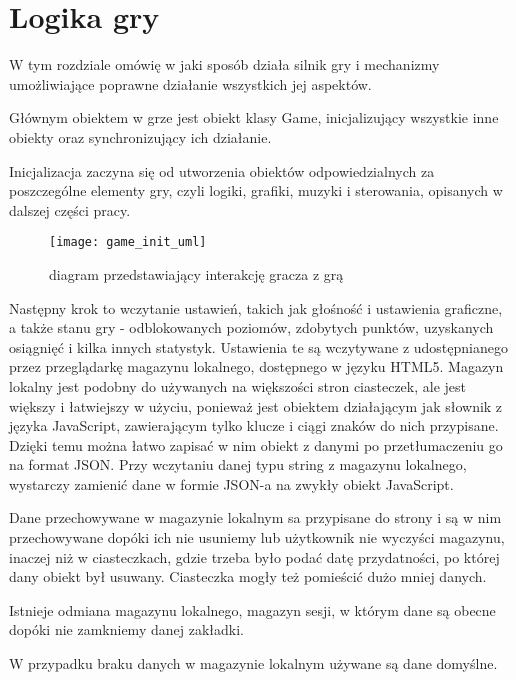 \chapter{Logika gry}
\thispagestyle{chapterBeginStyle}
\label{chapter_logic}

\smallskip

W tym rozdziale omówię w jaki sposób działa silnik gry i mechanizmy umożliwiające poprawne działanie wszystkich jej aspektów.

Głównym obiektem w grze jest obiekt klasy Game, inicjalizujący wszystkie inne obiekty oraz synchronizujący ich działanie.

Inicjalizacja zaczyna się od utworzenia obiektów odpowiedzialnych za poszczególne elementy gry, czyli logiki, grafiki, muzyki i sterowania, opisanych w dalszej czę\'sci pracy.

\begin{wrapfigure}{l}{0.39\textwidth}
	\centering
	\noindent\texttt{[image: game\_init\_uml]}
	\caption{diagram przedstawiający interakcję gracza z grą}
\end{wrapfigure}
Następny krok to wczytanie ustawień, takich jak gło\'sno\'sć i ustawienia graficzne, a także stanu gry - odblokowanych poziomów, zdobytych punktów, uzyskanych osiągnięć i kilka innych statystyk. Ustawienia te są wczytywane z udostępnianego przez przeglądarkę magazynu lokalnego, dostępnego w języku HTML5. Magazyn lokalny jest podobny do używanych na większo\'sci stron ciasteczek, ale jest większy i łatwiejszy w użyciu, ponieważ jest obiektem działającym jak słownik z języka JavaScript, zawierającym tylko klucze i ciągi znaków do nich przypisane. Dzięki temu można łatwo zapisać w nim obiekt z danymi po przetłumaczeniu go na format JSON. Przy wczytaniu danej typu string z magazynu lokalnego, wystarczy zamienić dane w formie JSON-a na zwykły obiekt JavaScript.

Dane przechowywane w magazynie lokalnym sa przypisane do strony i są w nim przechowywane dopóki ich nie usuniemy lub użytkownik nie wyczy\'sci magazynu, inaczej niż w ciasteczkach, gdzie trzeba było podać datę przydatno\'sci, po której dany obiekt był usuwany. Ciasteczka mogły też pomie\'scić dużo mniej danych.

Istnieje odmiana magazynu lokalnego, magazyn sesji, w którym dane są obecne dopóki nie zamkniemy danej zakładki.

W przypadku braku danych w magazynie lokalnym używane są dane domy\'slne.

